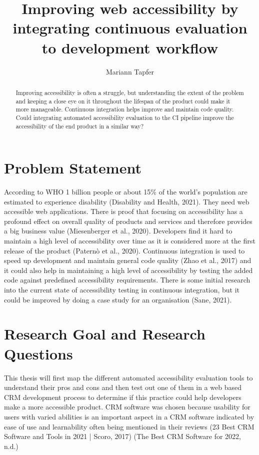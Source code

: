 \documentclass{thesis_proposal}
\title{Improving web accessibility by integrating continuous evaluation to development workflow}
\author{Mariann Tapfer}
\begin{document}
\maketitle

\begin{abstract}
    Improving accessibility is often a struggle, but understanding the extent of the problem and keeping a close eye on it throughout the lifespan of the product could make it more manageable. Continuous integration helps improve and maintain code quality. Could integrating automated accessibility evaluation to the CI pipeline improve the accessibility of the end product in a similar way?
\end{abstract}

\section{Problem Statement}
According to WHO 1 billion people or about 15\% of the world's population are estimated to experience disability (Disability and Health, 2021). They need web accessible web applications. There is proof that focusing on accessibility has a profound effect on overall quality of products and services and therefore provides a big business value  (Miesenberger et al., 2020).
Developers find it hard to maintain a high level of accessibility over time as it is considered more at the first release of the product (Paternò et al., 2020). Continuous integration is used to speed up development and maintain general code quality (Zhao et al., 2017) and it could also help in maintaining a high level of accessibility by testing the added code against predefined accessibility requirements. There is some initial research into the current state of accessibility testing in continuous integration, but it could be improved by doing a case study for an organisation (Sane, 2021).


\section{Research Goal and Research Questions}
This thesis will first map the different automated accessibility evaluation tools to understand their pros and cons and then test out one of them in a web based CRM development process to determine if this practice could help developers make a more accessible product. CRM software was chosen because usability for users with varied abilities is an important aspect in a CRM software indicated by ease of use and learnability often being mentioned in their reviews (23 Best CRM Software and Tools in 2021 | Scoro, 2017) (The Best CRM Software for 2022, n.d.)
\end{document}
